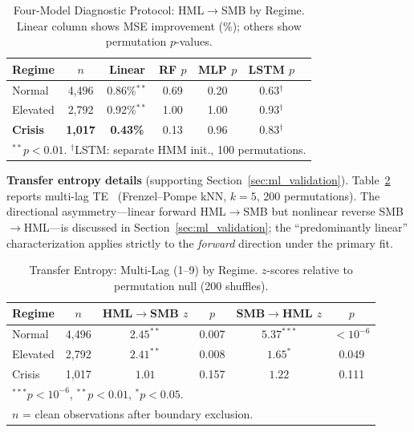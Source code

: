 \documentclass[sigconf,anonymous]{acmart}
\begin{document}
\begin{table}[t]
\centering
\caption[Four-model diagnostics]{Four-Model Diagnostic Protocol: HML$\to$SMB by Regime.
Linear column shows MSE improvement (\%); others show permutation $p$-values.}
\label{tab:neural}
\small
\begin{tabular}{lcccccc}
\toprule
Regime & $n$ & Linear & RF $p$ & MLP $p$ & LSTM $p$ \\
\midrule
Normal & 4,496 & 0.86\%$^{**}$ & 0.69 & 0.20 & 0.63$^\dagger$ \\
Elevated & 2,792 & 0.92\%$^{**}$ & 1.00 & 1.00 & 0.93$^\dagger$ \\
\textbf{Crisis} & \textbf{1,017} & \textbf{0.43\%} & 0.13 & 0.96 & 0.83$^\dagger$ \\
\bottomrule
\multicolumn{7}{l}{\footnotesize $^{**}p < 0.01$. $^\dagger$LSTM: separate HMM init., 100 permutations.} \\
\end{tabular}
\end{table}

\textbf{Transfer entropy details} (supporting Section~\ref{sec:ml_validation}).
Table~\ref{tab:te} reports multi-lag TE~\cite{schreiber2000measuring,barnett2009granger}
(Frenzel--Pompe kNN, $k=5$, 200 permutations).
The directional asymmetry---linear forward HML$\to$SMB but nonlinear
reverse SMB$\to$HML---is discussed in Section~\ref{sec:ml_validation};
the ``predominantly linear'' characterization applies strictly to the
\emph{forward} direction under the primary fit.

\begin{table}[t]
\centering
\caption{Transfer Entropy: Multi-Lag (1--9) by Regime.
$z$-scores relative to permutation null (200 shuffles).}
\label{tab:te}
\scriptsize
\begin{tabular}{@{}lccccc@{}}
\toprule
Regime & $n$ & HML$\to$SMB $z$ & $p$ & SMB$\to$HML $z$ & $p$ \\
\midrule
Normal & 4,496 & $2.45^{**}$ & 0.007 & $5.37^{***}$ & $< 10^{-6}$ \\
Elevated & 2,792 & $2.41^{**}$ & 0.008 & $1.65^{*}$ & 0.049 \\
Crisis & 1,017 & $1.01$ & 0.157 & $1.22$ & 0.111 \\
\bottomrule
\multicolumn{6}{l}{\footnotesize $^{***}p < 10^{-6}$, $^{**}p < 0.01$, $^{*}p < 0.05$.} \\
\multicolumn{6}{l}{\footnotesize $n$ = clean observations after boundary exclusion.} \\
\end{tabular}
\end{table}
\end{document}
